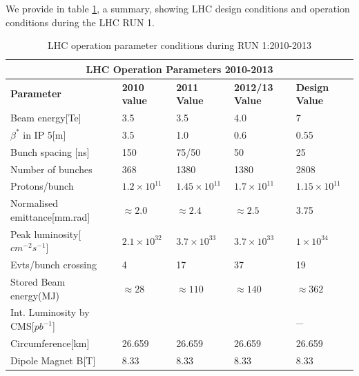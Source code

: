 We provide in table \ref{tab:tableLHC}, a summary, showing LHC design conditions and operation conditions during the LHC RUN 1. 
\begin{center}
 \begin{table}[H]
  \begin{turn}{90}
  \centering
  \begin{tabular}{|l|l|l|l|l|}
  \hline \hline
  \multicolumn{5}{|c|}{\bfseries{LHC Operation Parameters 2010-2013}} \\
  \hline \hline
  \bfseries{Parameter} & \bfseries{2010 value} & \bfseries{2011 Value} & \bfseries{2012/13 Value} & \bfseries{Design Value} \\
   \hline \hline
   Beam energy[Te] & 3.5  & 3.5  & 4.0  & 7 \\ 
  \hline
  $\beta^{\ast}$ in IP 5[m] & 3.5 & 1.0 & 0.6  & 0.55 \\
  \hline
   Bunch spacing [ns]& 150 & 75/50 & 50 & 25 \\
  \hline
  Number of bunches & 368 & 1380 & 1380 & 2808 \\
  \hline
  Protons/bunch  & $1.2 \times 10^{11}$ & $1.45 \times 10^{11}$ &  $1.7 \times 10^{11}$& $1.15 \times 10^{11}$ \\
  \hline
  Normalised emittance[mm.rad] & $\approx 2.0$ & $\approx 2.4$ & $\approx 2.5$ &  3.75\\
  \hline
  Peak luminosity[$cm^{-2}s^{-1}$]& $2.1 \times 10^{32}$ & $3.7 \times 10^{33}$ & $3.7 \times 10^{33}$ & $1 \times 10^{34}$ \\
  \hline
  Evts/bunch crossing & 4 & 17 & 37 &  19 \\
  \hline
  Stored Beam energy(MJ)& $\approx 28$ &  $\approx 110$  & $\approx 140$  & $\approx 362$ \\
  \hline
  Int. Luminosity by CMS[$pb^{-1}$]&  &  &  &  \_ \\
 \hline
 Circumference[km]  &26.659 & 26.659 & 26.659 & 26.659 \\
 \hline
 Dipole Magnet B[T] & 8.33 & 8.33 & 8.33 & 8.33 \\
 \hline  
  \end{tabular}
   \caption{LHC operation parameter conditions during RUN 1:2010-2013}
   \label{tab:tableLHC}
   \end{turn}
  \end{table}
\end{center}


